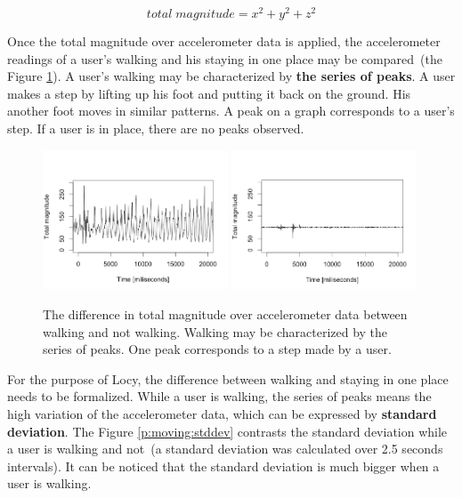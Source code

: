 \begin{equation}\label{e:total_magnitude}
total\;magnitude = x^2 + y^2 + z^2
\end{equation}

Once the total magnitude over accelerometer data is applied, the accelerometer readings of a user's walking and his staying in one place may be compared\ (the Figure \ref{p:moving:magnitude}). A user's walking may be characterized by \textbf{the series of peaks}. A user makes a step by lifting up his foot and putting it back on the ground. His another foot moves in similar patterns. A peak on a graph corresponds to a user's step. If a user is in place, there are no peaks observed. 

\begin{figure}[H]
\centering
\includegraphics[width=0.49\textwidth, scale=0.6]{plots/walking}
\includegraphics[width=0.49\textwidth, scale=0.6]{plots/no_walking}
\caption{\label{p:moving:magnitude} The difference in total magnitude over accelerometer data between walking and not walking. Walking may be characterized by the series of peaks. One peak corresponds to  a step made by a user.}
\end{figure}

For the purpose of Locy, the difference between walking and staying in one place needs to be formalized. While a user is walking, the series of peaks means the high variation of the accelerometer data, which can be expressed by \textbf{standard deviation}. The Figure \ref{p:moving:stddev} contrasts the standard deviation while a user is walking and not\ (a standard deviation was calculated over 2.5 seconds intervals). It can be noticed that the standard deviation is much bigger when a user is walking.

